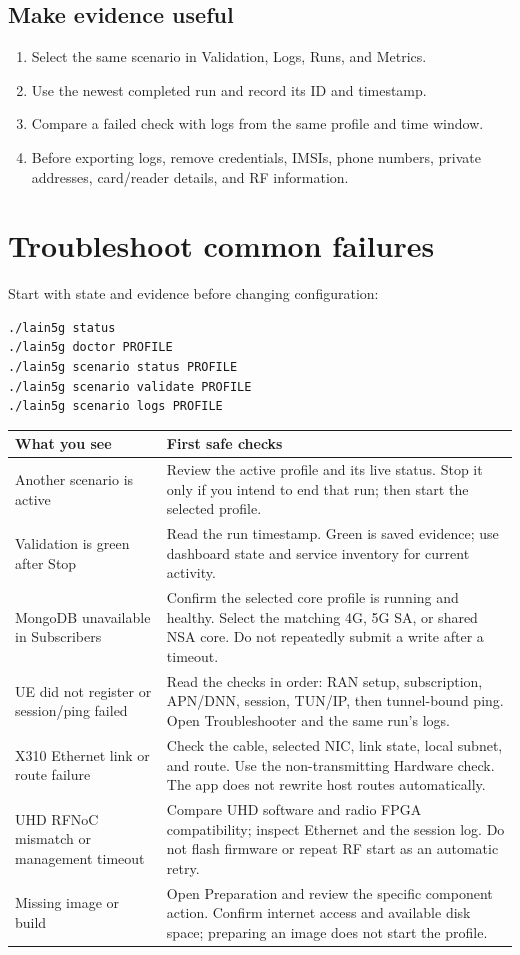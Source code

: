 \documentclass[11pt,a4paper,oneside]{article}
\newcommand{\manualsection}[2]{\clearpage\section{#1}\label{#2}}
\begin{document}
\subsection{Make evidence useful}
\begin{enumerate}
  \item Select the same scenario in Validation, Logs, Runs, and Metrics.
  \item Use the newest completed run and record its ID and timestamp.
  \item Compare a failed check with logs from the same profile and time window.
  \item Before exporting logs, remove credentials, IMSIs, phone numbers, private addresses, card/reader details, and RF information.
\end{enumerate}

\manualsection{Troubleshoot common failures}{troubleshooting}
Start with state and evidence before changing configuration:
\begin{codebox}
\begin{Verbatim}[fontsize=\small]
./lain5g status
./lain5g doctor PROFILE
./lain5g scenario status PROFILE
./lain5g scenario validate PROFILE
./lain5g scenario logs PROFILE
\end{Verbatim}
\end{codebox}

\begin{center}
\begin{tabularx}{\linewidth}{B{3.8cm} Y}
\toprule
What you see & First safe checks \\
\midrule
Another scenario is active & Review the active profile and its live status. Stop it only if you intend to end that run; then start the selected profile. \\
Validation is green after Stop & Read the run timestamp. Green is saved evidence; use dashboard state and service inventory for current activity. \\
MongoDB unavailable in Subscribers & Confirm the selected core profile is running and healthy. Select the matching 4G, 5G SA, or shared NSA core. Do not repeatedly submit a write after a timeout. \\
UE did not register or session/ping failed & Read the checks in order: RAN setup, subscription, APN/DNN, session, TUN/IP, then tunnel-bound ping. Open Troubleshooter and the same run's logs. \\
X310 Ethernet link or route failure & Check the cable, selected NIC, link state, local subnet, and route. Use the non-transmitting Hardware check. The app does not rewrite host routes automatically. \\
UHD RFNoC mismatch or management timeout & Compare UHD software and radio FPGA compatibility; inspect Ethernet and the session log. Do not flash firmware or repeat RF start as an automatic retry. \\
Missing image or build & Open Preparation and review the specific component action. Confirm internet access and available disk space; preparing an image does not start the profile. \\
\bottomrule
\end{tabularx}
\end{center}
\end{document}
